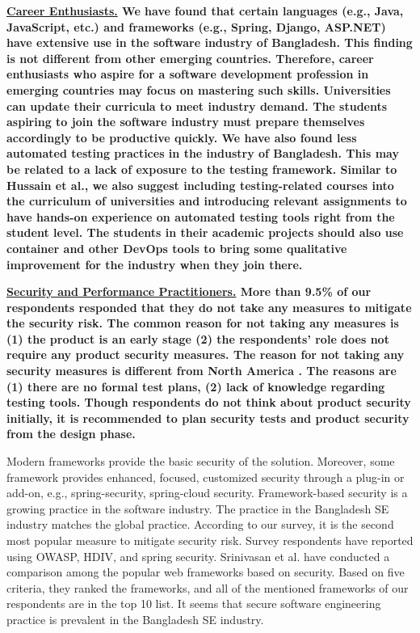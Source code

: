 \bf{\ul{Career Enthusiasts.}} We have found that certain languages (e.g.,
Java, JavaScript, etc.) and frameworks (e.g., Spring, Django, ASP.NET) have
extensive use in the software industry of Bangladesh. This finding is not different from 
other emerging countries. Therefore, career enthusiasts who aspire for a software development profession in 
emerging countries may focus on mastering such skills. Universities can update
their curricula to meet industry demand. The students aspiring to join the
software industry must prepare themselves accordingly to be productive quickly.
We have also found less automated testing practices in the industry of
Bangladesh. This may be related to a lack of exposure to the testing framework.
Similar to Hussain et al.\citep{Hussain2020}, we also suggest including
testing-related courses into the curriculum of universities and introducing
relevant assignments to have hands-on experience on automated testing tools
right from the student level. The students in their academic projects should
also use container and other DevOps tools to bring some qualitative improvement
for the industry when they join there.

\bf{\ul{Security and Performance Practitioners.}} More than 9.5\% of our respondents
responded that they do not take any measures to mitigate the security risk. The
common reason for not taking any measures is (1) the product is an early stage
(2) the respondents' role does not require any product security measures. The
reason for not taking any security measures is different from North
America \citep{Assal2019}. The reasons are (1) there are no formal test plans,
(2) lack of knowledge regarding testing tools. Though respondents do not think
about product security initially, it is recommended \citep{Chandra2009,Azham2011}
to plan security tests and product security from the design phase.

Modern frameworks provide the basic security of the solution. Moreover, some
framework provides enhanced, focused, customized security through a plug-in or
add-on, e.g., spring-security, spring-cloud security. Framework-based security
is a growing practice in the software industry\citep{Alssir2012}. The practice
in the Bangladesh SE industry matches the global practice. According to our
survey, it is the second most popular measure to mitigate security risk. Survey
respondents have reported using OWASP, HDIV, and spring security. Srinivasan et
al.\citep{Srinivasan2017} have conducted a comparison among the popular web
frameworks based on security. Based on five criteria, they ranked the
frameworks, and all of the mentioned frameworks of our respondents are in the
top 10 list. It seems that secure software engineering practice is prevalent in
the Bangladesh SE industry.


